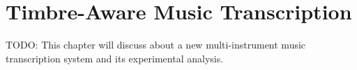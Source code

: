 
\graphicspath{{7-timbre/figures/}}

\chapter{Timbre-Aware Music Transcription}
\label{ch:timbre}

TODO: This chapter will discuss about a new multi-instrument music transcription system and its experimental analysis.
